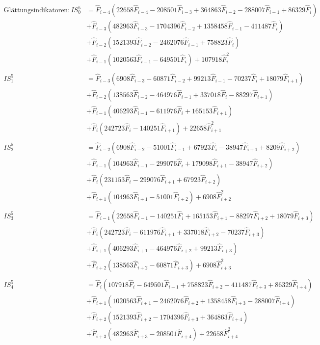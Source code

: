 \begin{align*}
\text{Glättungsindikatoren}:
IS^5_0 &= \hat{F}_{i-4} (22658 \hat{F}_{i-4} - 208501 \hat{F}_{i-3} + 364863 \hat{F}_{i-2} - 288007 \hat{F}_{i-1} + 86329 \hat{F}_{i})\\
&+ \hat{F}_{i-3} (482963 \hat{F}_{i-3} - 1704396 \hat{F}_{i-2} + 1358458 \hat{F}_{i-1} - 411487 \hat{F}_{i})\\
&+ \hat{F}_{i-2} (1521393 \hat{F}_{i-2} - 2462076 \hat{F}_{i-1} + 758823 \hat{F}_{i})\\
&+ \hat{F}_{i-1} (1020563 \hat{F}_{i-1} - 649501 \hat{F}_{i}) + 107918 \hat{F}_{i}^2\\
\\
IS^5_1 &= \hat{F}_{i-3} (6908 \hat{F}_{i-3} - 60871 \hat{F}_{i-2} + 99213 \hat{F}_{i-1} - 70237 \hat{F}_{i} + 18079 \hat{F}_{i+1})\\
&+ \hat{F}_{i-2} (138563 \hat{F}_{i-2} - 464976 \hat{F}_{i-1} + 337018 \hat{F}_{i} - 88297 \hat{F}_{i+1})\\
&+ \hat{F}_{i-1} (406293 \hat{F}_{i-1} - 611976 \hat{F}_{i} + 165153 \hat{F}_{i+1})\\
&+ \hat{F}_{i} (242723 \hat{F}_{i} - 140251 \hat{F}_{i+1}) + 22658 \hat{F}_{i+1}^2\\
\\
IS^5_2 &= \hat{F}_{i-2} (6908 \hat{F}_{i-2} - 51001 \hat{F}_{i-1} + 67923 \hat{F}_{i} - 38947 \hat{F}_{i+1} + 8209 \hat{F}_{i+2})\\
&+ \hat{F}_{i-1} (104963 \hat{F}_{i-1} - 299076 \hat{F}_{i} + 179098 \hat{F}_{i+1} - 38947 \hat{F}_{i+2})\\
&+ \hat{F}_{i} (231153 \hat{F}_{i} - 299076 \hat{F}_{i+1} + 67923 \hat{F}_{i+2})\\
&+ \hat{F}_{i+1} (104963 \hat{F}_{i+1} - 51001 \hat{F}_{i+2}) + 6908 \hat{F}_{i+2}^2\\
\\
IS^5_3 &= \hat{F}_{i-1} (22658 \hat{F}_{i-1} - 140251 \hat{F}_{i} + 165153 \hat{F}_{i+1} - 88297 \hat{F}_{i+2} + 18079 \hat{F}_{i+3})\\
&+ \hat{F}_{i} (242723 \hat{F}_{i} - 611976 \hat{F}_{i+1} + 337018 \hat{F}_{i+2} - 70237 \hat{F}_{i+3})\\
&+ \hat{F}_{i+1} (406293 \hat{F}_{i+1} - 464976 \hat{F}_{i+2} + 99213 \hat{F}_{i+3})\\
&+ \hat{F}_{i+2} (138563 \hat{F}_{i+2} - 60871 \hat{F}_{i+3}) + 6908 \hat{F}_{i+3}^2\\
\\
IS^5_4 &= \hat{F}_{i} (107918 \hat{F}_{i} - 649501 \hat{F}_{i+1} + 758823 \hat{F}_{i+2} - 411487 \hat{F}_{i+3} + 86329 \hat{F}_{i+4})\\
&+ \hat{F}_{i+1} (1020563 \hat{F}_{i+1} - 2462076 \hat{F}_{i+2} + 1358458 \hat{F}_{i+3} - 288007 \hat{F}_{i+4})\\
&+ \hat{F}_{i+2} (1521393 \hat{F}_{i+2} - 1704396 \hat{F}_{i+3} + 364863 \hat{F}_{i+4})\\
&+ \hat{F}_{i+3} (482963 \hat{F}_{i+3} - 208501 \hat{F}_{i+4}) + 22658 \hat{F}_{i+4}^2\\
\end{align*}

